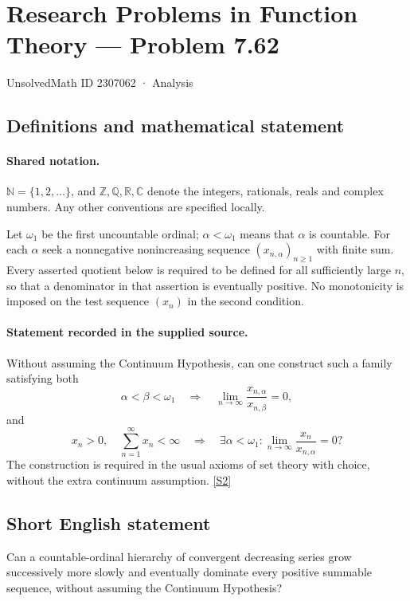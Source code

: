 \documentclass[11pt]{article}
\newcommand{\sref}[2]{\hyperlink{source:#1:#2}{[S#2]}}
\begin{document}
\setcounter{section}{2307061}
\section{Research Problems in Function Theory — Problem 7.62}\label{2307062}
{\small\sffamily UnsolvedMath ID 2307062 · Analysis}
\subsection{Definitions and mathematical statement}

\paragraph{Shared notation.}$\mathbb N=\{1,2,\ldots\}$, and $\mathbb Z,\mathbb Q,\mathbb R,\mathbb C$ denote the integers, rationals, reals and complex numbers. Any other conventions are specified locally.


Let $\omega_1$ be the first uncountable ordinal; $\alpha<\omega_1$ means that $\alpha$ is countable. For each $\alpha$ seek a nonnegative nonincreasing sequence $(x_{n,\alpha})_{n\ge1}$ with finite sum. Every asserted quotient below is required to be defined for all sufficiently large $n$, so that a denominator in that assertion is eventually positive. No monotonicity is imposed on the test sequence $(x_n)$ in the second condition.
\paragraph{Statement recorded in the supplied source.}
Without assuming the Continuum Hypothesis, can one construct such a family satisfying both
\[\alpha<\beta<\omega_1\quad\Longrightarrow\quad
\lim_{n\to\infty}\frac{x_{n,\alpha}}{x_{n,\beta}}=0,
\]
and
\[x_n>0,\quad\sum_{n=1}^\infty x_n<\infty
\quad\Longrightarrow\quad
\exists\alpha<\omega_1:\lim_{n\to\infty}\frac{x_n}{x_{n,\alpha}}=0?
\]
The construction is required in the usual axioms of set theory with choice, without the extra continuum assumption. \sref{2307062}{2}
\subsection{Short English statement}
Can a countable-ordinal hierarchy of convergent decreasing series grow successively more slowly and eventually dominate every positive summable sequence, without assuming the Continuum Hypothesis?
\end{document}

